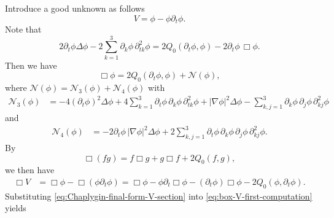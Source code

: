 \documentclass[11pt,twoside]{article}
\theoremstyle{plain}
\theoremstyle{definition}
\theoremstyle{assumption}
\numberwithin{equation}{section}
\begin{document}
	Introduce a good unknown as follows
	\begin{equation}
		\label{eq:V-definition}
		V=\phi-\phi\partial_t\phi.
	\end{equation}
	Note that	
	\begin{equation}
		\label{eq:quadratic-part-Q0-identity}
		2\partial_t\phi\Delta\phi
		-
		2\sum_{k=1}^3\partial_k\phi\,\partial_{tk}^2\phi
		=
		2Q_0(\partial_t\phi,\phi)
		-
		2\partial_t\phi\,\Box\phi .
	\end{equation}
	Then we have
	\begin{equation}\label{eq:Chaplygin-final-form-V-section}
		\Box\phi
		=
		2Q_0(\partial_t\phi,\phi)
		+\mathcal N(\phi),
		\end{equation}
where $\mathcal N(\phi)
		=\mathcal N_3(\phi)+\mathcal N_4(\phi)$ with
	\begin{equation}
		\label{eq:N3-definition-V-section}
		\begin{split}
			\mathcal N_3(\phi)
			&=
			-4(\partial_t\phi)^2\Delta\phi
			+
			4\sum_{k=1}^3
			\partial_t\phi\,\partial_k\phi\,\partial_{tk}^2\phi
			+
			|\nabla\phi|^2\Delta\phi
			-
			\sum_{k,j=1}^3
			\partial_k\phi\,\partial_j\phi\,\partial_{kj}^2\phi
		\end{split}
	\end{equation}
and
	\begin{equation}
		\label{eq:N4-definition-V-section}
		\begin{split}
			\mathcal N_4(\phi)
			&=
			-2\partial_t\phi\,|\nabla\phi|^2\Delta\phi
			+
			2\sum_{k,j=1}^3
			\partial_t\phi\,\partial_k\phi\,\partial_j\phi\,\partial_{kj}^2\phi.
		\end{split}
	\end{equation}
	By
	\begin{equation}
		\label{eq:box-product-identity-V-section}
		\Box(fg)
		=f\Box g+g\Box f+2Q_0(f,g),
	\end{equation}
	we then have
	\begin{equation}
		\label{eq:box-V-first-computation}
		\begin{split}
			\Box V
			&=\Box\phi
			-\Box(\phi\partial_t\phi)=
			\Box\phi
			-\phi\partial_t\Box\phi
			-(\partial_t\phi)\Box\phi
			-2Q_0(\phi,\partial_t\phi).
		\end{split}
	\end{equation}
	Substituting \eqref{eq:Chaplygin-final-form-V-section} into
	\eqref{eq:box-V-first-computation} yields
	
\end{document}
